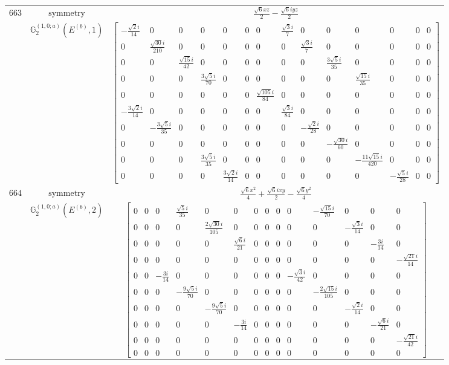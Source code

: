 \documentclass[fleqn,8pt,landscape]{jsarticle}
\begin{document}
\begin{longtable}{ccc}
$ 663 $ & $ \text{symmetry} $ & $ \frac{\sqrt{6} x z}{2} - \frac{\sqrt{6} i y z}{2} $ \\
$  $ & $ \mathbb{G}_{2}^{(1,0;a)}(E^{(b)},1) $ & $ \begin{bmatrix} - \frac{\sqrt{2} i}{14} & 0 & 0 & 0 & 0 & 0 & 0 & \frac{\sqrt{3} i}{7} & 0 & 0 & 0 & 0 & 0 & 0 \\ 0 & \frac{\sqrt{30} i}{210} & 0 & 0 & 0 & 0 & 0 & 0 & \frac{\sqrt{3} i}{7} & 0 & 0 & 0 & 0 & 0 \\ 0 & 0 & \frac{\sqrt{15} i}{42} & 0 & 0 & 0 & 0 & 0 & 0 & \frac{3 \sqrt{5} i}{35} & 0 & 0 & 0 & 0 \\ 0 & 0 & 0 & \frac{3 \sqrt{5} i}{70} & 0 & 0 & 0 & 0 & 0 & 0 & \frac{\sqrt{15} i}{35} & 0 & 0 & 0 \\ 0 & 0 & 0 & 0 & 0 & 0 & \frac{\sqrt{105} i}{84} & 0 & 0 & 0 & 0 & 0 & 0 & 0 \\ - \frac{3 \sqrt{2} i}{14} & 0 & 0 & 0 & 0 & 0 & 0 & \frac{\sqrt{3} i}{84} & 0 & 0 & 0 & 0 & 0 & 0 \\ 0 & - \frac{3 \sqrt{5} i}{35} & 0 & 0 & 0 & 0 & 0 & 0 & - \frac{\sqrt{2} i}{28} & 0 & 0 & 0 & 0 & 0 \\ 0 & 0 & 0 & 0 & 0 & 0 & 0 & 0 & 0 & - \frac{\sqrt{30} i}{60} & 0 & 0 & 0 & 0 \\ 0 & 0 & 0 & \frac{3 \sqrt{5} i}{35} & 0 & 0 & 0 & 0 & 0 & 0 & - \frac{11 \sqrt{15} i}{420} & 0 & 0 & 0 \\ 0 & 0 & 0 & 0 & \frac{3 \sqrt{2} i}{14} & 0 & 0 & 0 & 0 & 0 & 0 & - \frac{\sqrt{5} i}{28} & 0 & 0 \end{bmatrix} $ \\ \hline
$ 664 $ & $ \text{symmetry} $ & $ \frac{\sqrt{6} x^{2}}{4} + \frac{\sqrt{6} i x y}{2} - \frac{\sqrt{6} y^{2}}{4} $ \\
$  $ & $ \mathbb{G}_{2}^{(1,0;a)}(E^{(b)},2) $ & $ \begin{bmatrix} 0 & 0 & 0 & \frac{\sqrt{5} i}{35} & 0 & 0 & 0 & 0 & 0 & 0 & - \frac{\sqrt{15} i}{70} & 0 & 0 & 0 \\ 0 & 0 & 0 & 0 & \frac{2 \sqrt{30} i}{105} & 0 & 0 & 0 & 0 & 0 & 0 & - \frac{\sqrt{3} i}{14} & 0 & 0 \\ 0 & 0 & 0 & 0 & 0 & \frac{\sqrt{6} i}{21} & 0 & 0 & 0 & 0 & 0 & 0 & - \frac{3 i}{14} & 0 \\ 0 & 0 & 0 & 0 & 0 & 0 & 0 & 0 & 0 & 0 & 0 & 0 & 0 & - \frac{\sqrt{21} i}{14} \\ 0 & 0 & - \frac{3 i}{14} & 0 & 0 & 0 & 0 & 0 & 0 & - \frac{\sqrt{3} i}{42} & 0 & 0 & 0 & 0 \\ 0 & 0 & 0 & - \frac{9 \sqrt{5} i}{70} & 0 & 0 & 0 & 0 & 0 & 0 & - \frac{2 \sqrt{15} i}{105} & 0 & 0 & 0 \\ 0 & 0 & 0 & 0 & - \frac{9 \sqrt{5} i}{70} & 0 & 0 & 0 & 0 & 0 & 0 & - \frac{\sqrt{2} i}{14} & 0 & 0 \\ 0 & 0 & 0 & 0 & 0 & - \frac{3 i}{14} & 0 & 0 & 0 & 0 & 0 & 0 & - \frac{\sqrt{6} i}{21} & 0 \\ 0 & 0 & 0 & 0 & 0 & 0 & 0 & 0 & 0 & 0 & 0 & 0 & 0 & - \frac{\sqrt{21} i}{42} \\ 0 & 0 & 0 & 0 & 0 & 0 & 0 & 0 & 0 & 0 & 0 & 0 & 0 & 0 \end{bmatrix} $ \\ \hline

\end{longtable}
\end{document}
